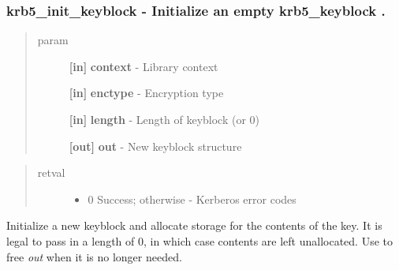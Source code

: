 \documentclass[letterpaper,10pt,english]{sphinxmanual}
\begin{document}
\subsubsection{krb5\_init\_keyblock -  Initialize an empty krb5\_keyblock .}
\label{appdev/refs/api/krb5_init_keyblock:krb5-init-keyblock-initialize-an-empty-krb5-keyblock}\label{appdev/refs/api/krb5_init_keyblock::doc}

\begin{fulllineitems}
\label{appdev/refs/api/krb5_init_keyblock:c.krb5_init_keyblock}
\end{fulllineitems}

\begin{quote}\begin{description}
\item[{param}] \leavevmode
\textbf{{[}in{]}} \textbf{context} - Library context

\textbf{{[}in{]}} \textbf{enctype} - Encryption type

\textbf{{[}in{]}} \textbf{length} - Length of keyblock (or 0)

\textbf{{[}out{]}} \textbf{out} - New keyblock structure

\end{description}\end{quote}
\begin{quote}\begin{description}
\item[{retval}] \leavevmode\begin{itemize}
\item {} 
0   Success; otherwise - Kerberos error codes

\end{itemize}

\end{description}\end{quote}

Initialize a new keyblock and allocate storage for the contents of the key. It is legal to pass in a length of 0, in which case contents are left unallocated. Use {\hyperref[appdev/refs/api/krb5_free_keyblock:c.krb5_free_keyblock]{}} to free \emph{out} when it is no longer needed.
\end{document}

